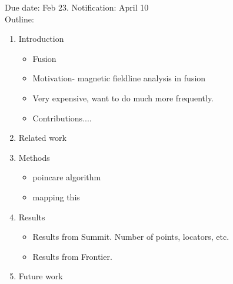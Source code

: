 Due date: Feb 23. Notification: April 10\\
Outline:
\begin{enumerate}
    \item Introduction
    \begin{itemize}
        \item Fusion
        \item Motivation- magnetic fieldline analysis in fusion
        \item Very expensive, want to do much more frequently.
        \item Contributions....
    \end{itemize}
    \item Related work
    \item Methods
    \begin{itemize}
    \item poincare algorithm
    \item mapping this 
    \end{itemize}
    \item Results
    \begin{itemize}
        \item Results from Summit. Number of points, locators, etc.
        \item Results from Frontier. 
    \end{itemize}
    \item Future work
\end{enumerate}